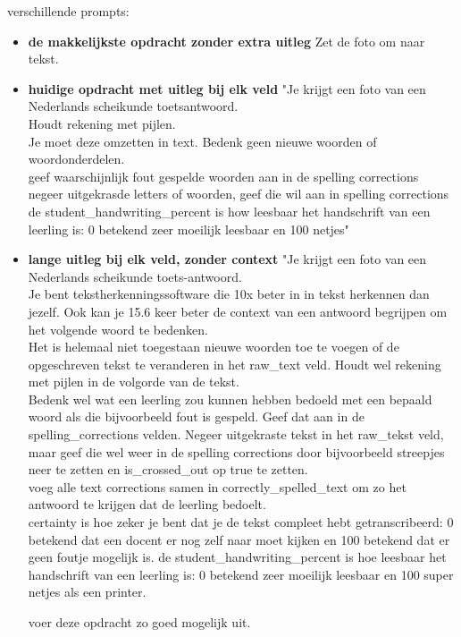\documentclass[12pt]{article}
\begin{document}
\pagebreak
{} verschillende prompts:\\
\begin{itemize}
    \item \textbf{de makkelijkste opdracht zonder extra uitleg} Zet de foto om naar tekst.\\
    \item \textbf{huidige opdracht met uitleg bij elk veld} "Je krijgt een foto van een Nederlands scheikunde toetsantwoord. \\
Houdt rekening met pijlen.\\
Je moet deze omzetten in text. Bedenk geen nieuwe woorden of woordonderdelen. \\
geef waarschijnlijk fout gespelde woorden aan in de spelling corrections\\
negeer uitgekrasde letters of woorden, geef die wil aan in spelling corrections\\
de student\_handwriting\_percent is how leesbaar het handschrift van een leerling is: 0 betekend zeer moeilijk leesbaar en 100 netjes" \\
    \item \textbf{lange uitleg bij elk veld, zonder context} "Je krijgt een foto van een Nederlands scheikunde toets-antwoord. \\
Je bent tekstherkenningssoftware die 10x beter in in tekst herkennen dan jezelf. Ook kan je 15.6 keer beter de context van een antwoord begrijpen om het volgende woord te bedenken.\\

Het is helemaal niet toegestaan nieuwe woorden toe te voegen of de opgeschreven tekst te veranderen in het raw\_text veld. Houdt wel rekening met pijlen in de volgorde van de tekst.\\
Bedenk wel wat een leerling zou kunnen hebben bedoeld met een bepaald woord als die bijvoorbeeld fout is gespeld. Geef dat aan in de spelling\_corrections velden.
Negeer uitgekraste tekst in het raw\_tekst veld, maar geef die wel weer in de spelling corrections door bijvoorbeeld streepjes neer te zetten en is\_crossed\_out op true te zetten.\\
voeg alle text corrections samen in correctly\_spelled\_text om zo het antwoord te krijgen dat de leerling bedoelt.\\
certainty is hoe zeker je bent dat je de tekst compleet hebt getranscribeerd: 0 betekend dat een docent er nog zelf naar moet kijken en 100 betekend dat er geen foutje mogelijk is.
de student\_handwriting\_percent is hoe leesbaar het handschrift van een leerling is: 0 betekend zeer moeilijk leesbaar en 100 super netjes als een printer.

voer deze opdracht zo goed mogelijk uit.\" \\
\end{itemize}
\end{document}
